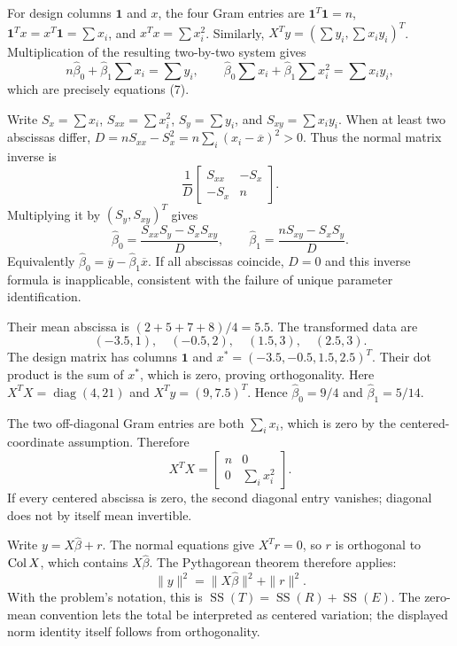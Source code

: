 For design columns $\mathbf1$ and $x$, the four Gram entries are
$\mathbf1^T\mathbf1=n$, $\mathbf1^Tx=x^T\mathbf1=\sum x_i$,
and $x^Tx=\sum x_i^2$. Similarly,
$X^Ty=(\sum y_i,\sum x_iy_i)^T$.
Multiplication of the resulting two-by-two system gives
\[
 n\widehat\beta_0+\widehat\beta_1\sum x_i=\sum y_i,
 \qquad
 \widehat\beta_0\sum x_i+\widehat\beta_1\sum x_i^2=\sum x_iy_i,
\]
which are precisely equations (7).

Write $S_x=\sum x_i$, $S_{xx}=\sum x_i^2$,
$S_y=\sum y_i$, and $S_{xy}=\sum x_iy_i$.
When at least two abscissas differ,
$D=nS_{xx}-S_x^2=n\sum_i(x_i-\overline x)^2>0$.
Thus the normal matrix inverse is
\[
 \frac1D\begin{bmatrix}S_{xx}&-S_x\\-S_x&n\end{bmatrix}.
\]
Multiplying it by $(S_y,S_{xy})^T$ gives
\[
 \boxed{\widehat\beta_0=\frac{S_{xx}S_y-S_xS_{xy}}D,\qquad
 \widehat\beta_1=\frac{nS_{xy}-S_xS_y}D}.
\]
Equivalently $\widehat\beta_0=\overline y-\widehat\beta_1\overline x$.
If all abscissas coincide, $D=0$ and this inverse formula is inapplicable,
consistent with the failure of unique parameter identification.

Their mean abscissa is $(2+5+7+8)/4=5.5$. The transformed data are
\[(-3.5,1),\quad(-0.5,2),\quad(1.5,3),\quad(2.5,3).\]
The design matrix has columns $\mathbf1$ and
$x^*=(-3.5,-0.5,1.5,2.5)^T$. Their dot product is the sum of
$x^*$, which is zero, proving orthogonality.
Here $X^TX=\operatorname{diag}(4,21)$ and
$X^Ty=(9,7.5)^T$. Hence
$\widehat\beta_0=9/4$ and $\widehat\beta_1=5/14$.

The two off-diagonal Gram entries are both $\sum_i x_i$, which
is zero by the centered-coordinate assumption. Therefore
\[
 X^TX=\begin{bmatrix}n&0\\0&\sum_i x_i^2\end{bmatrix}.
\]
If every centered abscissa is zero, the second diagonal entry vanishes;
diagonal does not by itself mean invertible.

Write $y=X\widehat\beta+r$. The normal equations give $X^Tr=0$,
so $r$ is orthogonal to $\operatorname{Col} X$, which contains $X\widehat\beta$.
The Pythagorean theorem therefore applies:
\[
 \|y\|^2=\|X\widehat\beta\|^2+\|r\|^2.
\]
With the problem's notation, this is
$\operatorname{SS}(T)=\operatorname{SS}(R)+\operatorname{SS}(E)$.
The zero-mean convention lets the total be interpreted as centered
variation; the displayed norm identity itself follows from orthogonality.

